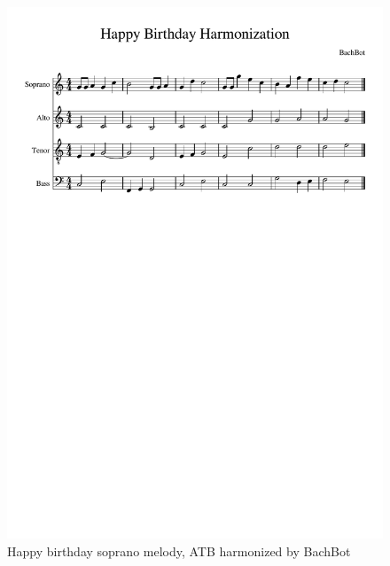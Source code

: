\begin{figure}[htpb]
  \centering
  \includegraphics[trim={0 19cm 0 3.7cm},clip,width=0.9\linewidth]{happy-birthday-score.pdf}
  \caption{Happy birthday soprano melody, ATB harmonized by BachBot}
  \label{fig:harm-happy-birthday}
\end{figure}

